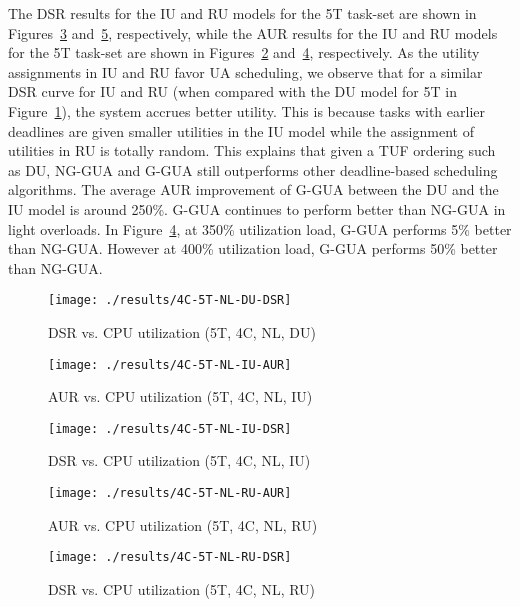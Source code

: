 \documentclass[12pt,dvips]{report}
\begin{document}
The DSR results for the IU and RU models for the 5T task-set are shown in Figures~\ref{fig:4C-5T-NL-IU-DSR} and~\ref{fig:4C-5T-NL-RU-DSR}, respectively, while the AUR results for the IU and RU models for the 5T task-set are shown in Figures~\ref{fig:4C-5T-NL-IU-AUR} and~\ref{fig:4C-5T-NL-RU-AUR}, respectively. As the utility assignments in IU and RU favor UA scheduling, we observe that for a similar DSR curve for IU and RU (when compared with the DU model for 5T in Figure~\ref{fig:4C-5T-NL-DU-DSR}), the system accrues better utility. This is because tasks with earlier deadlines are given smaller utilities in the IU model while the assignment of utilities in RU is totally random. This explains that given a TUF ordering such as DU, NG-GUA  and G-GUA still outperforms other deadline-based scheduling algorithms. The average AUR improvement of G-GUA between the DU and the IU model is around 250\%. G-GUA continues to perform better than NG-GUA in light overloads. In Figure~\ref{fig:4C-5T-NL-RU-AUR}, at 350\% utilization load, G-GUA performs 5\% better than NG-GUA. However at 400\% utilization load, G-GUA performs 50\% better than NG-GUA.

\begin{figure} [htbp]
  \centering
  \texttt{[image: ./results/4C-5T-NL-DU-DSR]}
  \caption{DSR vs. CPU utilization (5T, 4C, NL, DU)}
  \label{fig:4C-5T-NL-DU-DSR}
\end{figure}

\begin{figure} [htbp]
  \centering
  \texttt{[image: ./results/4C-5T-NL-IU-AUR]}
  \caption{AUR vs. CPU utilization (5T, 4C, NL, IU)}
  \label{fig:4C-5T-NL-IU-AUR}
\end{figure}
 
\begin{figure} [htbp]
  \centering
  \texttt{[image: ./results/4C-5T-NL-IU-DSR]}
  \caption{DSR vs. CPU utilization (5T, 4C, NL, IU)}
  \label{fig:4C-5T-NL-IU-DSR}
\end{figure}
 
\begin{figure} [htbp]
  \centering
  \texttt{[image: ./results/4C-5T-NL-RU-AUR]}
  \caption{AUR vs. CPU utilization (5T, 4C, NL, RU)}
  \label{fig:4C-5T-NL-RU-AUR}
\end{figure}
 
\begin{figure} [htbp]
  \centering
  \texttt{[image: ./results/4C-5T-NL-RU-DSR]}
  \caption{DSR vs. CPU utilization (5T, 4C, NL, RU)}
  \label{fig:4C-5T-NL-RU-DSR}
\end{figure}  
\end{document}
